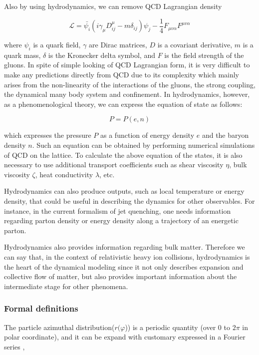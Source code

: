 Also by using hydrodynamics, we can remove QCD Lagrangian density

\begin{equation}
	\mathcal{L} = \bar{\psi_i}(i\gamma_\mu D^{\mu}_{ij} - m \delta_{ij})\psi_j - \frac{1}{4}F_{\mu v \alpha}F^{\mu v \alpha} 
\end{equation}
\smallskip

	where $\psi_i$ is a quark field, $\gamma$ are Dirac matrices, $D$ is a covariant derivative, $m$ is a quark mass, $\delta$ is the Kronecker delta symbol, and $F$ is the field strength of the gluons. In spite of simple looking of QCD Lagrangian form, it is very difficult to make any predictions directly from QCD due to its complexity which mainly arises from the non-linearity of the interactions of the gluons, the strong coupling, the dynamical many body system and confinement. In hydrodynamics, however, as a phenomenological theory, we can express the equation of state as follows: 
	
	\begin{equation}
		P = P(e, n)
	\end{equation}
	\smallskip 
	
	which expresses the pressure $P$ as a function of energy density $e$ and the baryon density $n$. Such an equation can be obtained by performing numerical simulations of QCD on the lattice. To calculate the above equation of the states, it is also necessary to use additional transport coefficients such as shear viscosity $\eta$, bulk viscosity $\zeta$, heat conductivity $\lambda$, etc. 
	
	Hydrodynamics can also produce outputs, such as local temperature or energy density, that could be useful in describing the dynamics for other observables. For instance, in the current formalism of jet quenching, one needs information regarding parton density or energy density along a trajectory of an energetic parton.
	
  Hydrodynamics also provides information regarding bulk matter. Therefore we can say that, in the context of relativistic heavy ion collisions, hydrodynamics is the heart of the dynamical modeling since it not only describes expansion and collective flow of matter, but also provides important information about the intermediate stage for other phenomena.
	
	\subsubsection{Formal definitions}
	The particle azimuthal distribution($r(\varphi$)) is a periodic quantity (over 0 to $2\pi$ in polar coordinate), and it can be expand with customary expressed in a Fourier series \cite{Voloshin:2008dg, Voloshin1996},
	

